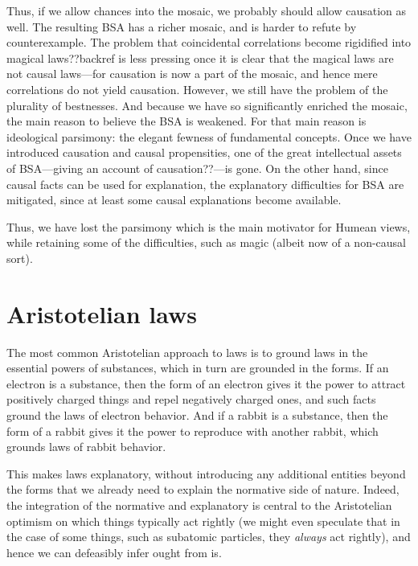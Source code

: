 Thus, if we allow chances into the mosaic, we probably should allow causation as well. The resulting BSA has a richer
mosaic, and is harder to refute by counterexample. The problem that coincidental correlations become rigidified into
magical laws??backref is less pressing once it is clear that the magical laws are not causal laws---for causation is 
now a part of the mosaic, and hence mere correlations do not yield causation. However, we still have the problem of 
the plurality of bestnesses. And because we have so significantly enriched the mosaic, the main reason to believe the
BSA is weakened. For that main reason is ideological parsimony: the elegant fewness of fundamental concepts. Once we 
have introduced causation and causal propensities, one of the great intellectual assets of BSA---giving
an account of causation??---is gone. On the other hand, since causal facts can be used for explanation, the explanatory difficulties for BSA are mitigated, since at least some causal explanations become available.

Thus, we have lost the parsimony which is the main motivator for Humean views, while retaining some of the 
difficulties, such as magic (albeit now of a non-causal sort).


\section{Aristotelian laws}
The most common Aristotelian approach to laws is to ground laws in the essential powers of substances, which in turn are
grounded in the forms. If an electron is a substance, then the form of an electron gives it the power to attract positively 
charged things and repel negatively charged ones, and such facts ground the laws of electron behavior. And if a rabbit is 
a substance, then the form of a rabbit gives it the power to reproduce with another rabbit, which grounds laws of rabbit
behavior. 

This makes laws explanatory, without introducing any additional entities beyond the forms that we already need to explain
the normative side of nature. Indeed, the integration of the normative and explanatory is central to the Aristotelian
optimism on which things typically act rightly (we might even speculate that in the case of some things, such as 
subatomic particles, they \textit{always} act rightly), and hence we can defeasibly infer ought from is.

